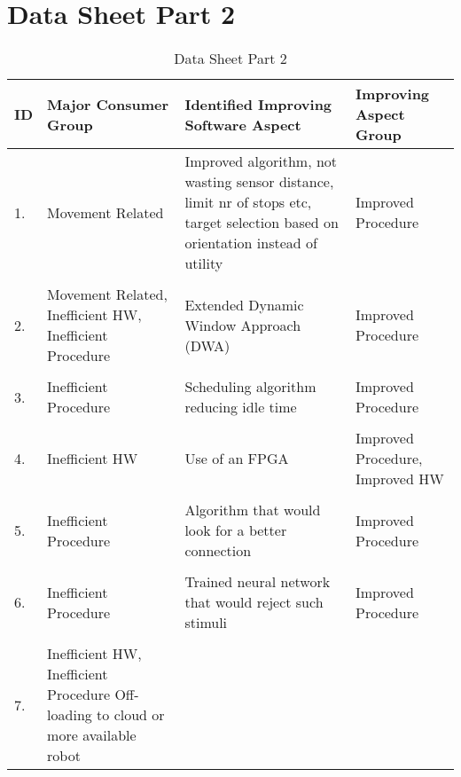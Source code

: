 \section{Data Sheet Part 2}
\label{appendix:data_sheet_2}

\begin{table}[h]
    \centering
    \caption{Data Sheet Part 2}
    \begin{tabular}{p{0.1cm}p{5cm}p{5cm}p{5cm}}
        \toprule
            {ID} &
                {Major Consumer Group} &
                {Identified Improving Software Aspect} &
                {Improving Aspect Group} \\
        \midrule
            {1.} &
                {Movement Related} &
                {Improved algorithm, not wasting sensor distance, limit nr of stops etc, 
                target selection based on orientation instead of utility} &
                {Improved Procedure} \\
            \hline
            \\
            {2.} &
                {Movement Related, Inefficient HW, Inefficient Procedure} &
                {Extended Dynamic Window Approach (DWA)} & 
                {Improved Procedure} \\
            \hline
            \\
            {3.} &
                {Inefficient Procedure} &
                {Scheduling algorithm reducing idle time} &
                {Improved Procedure} \\
            \hline
            \\
            {4.} &
                {Inefficient HW} &
                {Use of an FPGA} &
                {Improved Procedure, Improved HW} \\
            \hline
            \\
            {5.} &
                {Inefficient Procedure} &
                {Algorithm that would look for a better connection} &
                {Improved Procedure} \\
            \hline
            \\
            {6.} &
                {Inefficient Procedure} &
                {Trained neural network that would reject such stimuli} &
                {Improved Procedure} \\
            \hline
            \\
            {7.} &
                {Inefficient HW, Inefficient Procedure}
                {Off-loading to cloud or more available robot} &

\end{tabular}
\end{table}
